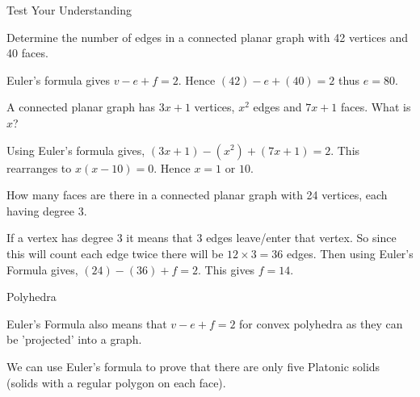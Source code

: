 \documentclass[8pt]{beamer}
\begin{document}
\begin{frame}{Test Your Understanding}
	\begin{Problem}
		Determine the number of edges in a connected planar graph with 42 vertices and 40 faces.
	\end{Problem}
	Euler's formula gives $v-e+f=2$. Hence  $(42)-e+(40)=2$ thus  $e=80$. 
	\begin{Problem}
		A connected planar graph has $3x+1$ vertices,  $x^2$ edges and $7x+1$ faces. What is  $x$?
	\end{Problem}
	Using Euler's formula gives, $(3x+1)-(x^2)+(7x+1)=2$. This rearranges to  $x(x-10)=0$. Hence  $x=1 \text{ or } 10$.
	\begin{Problem}
		How many faces are there in a connected planar graph with 24 vertices, each having degree 3.
		
	\end{Problem}
	If a vertex has degree 3 it means that 3 edges leave/enter that vertex. So since this will count each edge twice there will be $12 \times 3=36$ edges. Then using Euler's Formula gives,  $(24)-(36)+f=2$. This gives  $f=14$.

\end{frame}



\begin{frame}{Polyhedra}

	Euler's Formula also means that $v-e+f=2$ for convex polyhedra as they can be 'projected' into a graph.


	We can use Euler's formula to prove that there are only five Platonic solids (solids with a regular polygon on each face).
	
\end{frame}
\end{document}
